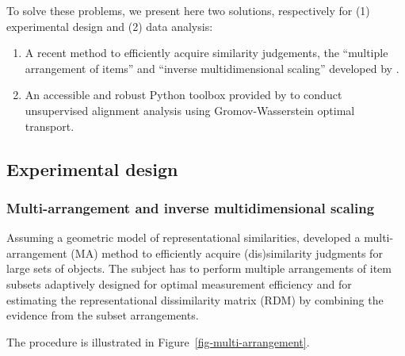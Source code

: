 \documentclass[
  authoryear]{elsarticle}
\providecommand{\tightlist}{%
  \setlength{\itemsep}{0pt}\setlength{\parskip}{0pt}}\usepackage{longtable,booktabs,array}
\begin{document}
To solve these problems, we present here two solutions, respectively for
(1) experimental design and (2) data analysis:

\begin{enumerate}
\def\labelenumi{\arabic{enumi}.}
\tightlist
\item
  A recent method to efficiently acquire similarity judgements, the
  ``multiple arrangement of items'' and ``inverse multidimensional
  scaling'' developed by \citet{kriegeskorteInverseMDSInferring2012}.
\item
  An accessible and robust Python toolbox provided by
  \citet{sasakiToolboxGromovWassersteinOptimal2023} to conduct
  unsupervised alignment analysis using Gromov-Wasserstein optimal
  transport.
\end{enumerate}

\subsection{Experimental design}\label{experimental-design}

\subsubsection{Multi-arrangement and inverse multidimensional
scaling}\label{multi-arrangement-and-inverse-multidimensional-scaling}

Assuming a geometric model of representational similarities,
\citet{kriegeskorteInverseMDSInferring2012} developed a
multi-arrangement (MA) method to efficiently acquire (dis)similarity
judgments for large sets of objects. The subject has to perform multiple
arrangements of item subsets adaptively designed for optimal measurement
efficiency and for estimating the representational dissimilarity matrix
(RDM) by combining the evidence from the subset arrangements.

The procedure is illustrated in Figure~\ref{fig-multi-arrangement}.
\end{document}
